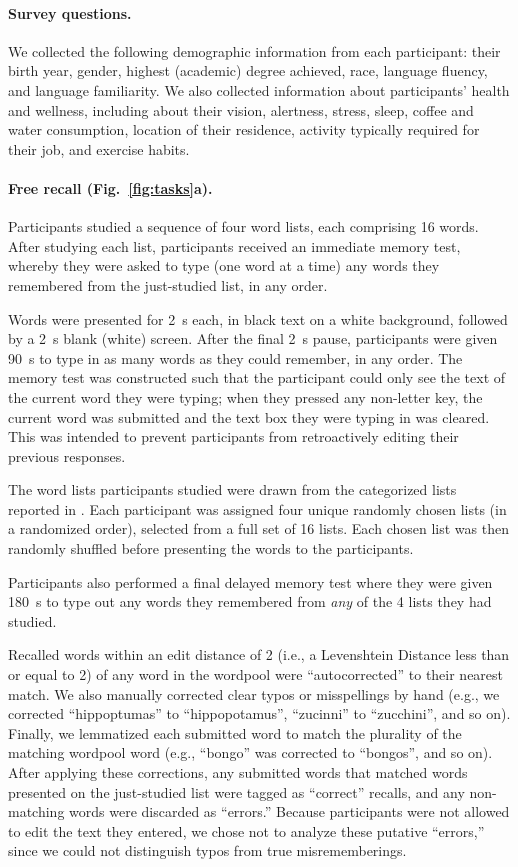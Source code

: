 \documentclass[10pt]{article}
\begin{document}
\paragraph*{Survey questions.}  We collected the following demographic
information from each participant: their birth year, gender, highest
(academic) degree achieved, race, language fluency, and language
familiarity.  We also collected information about participants'
health and wellness, including about their vision, alertness, stress, sleep, coffee
and water consumption, location of their residence, activity typically
required for their job, and exercise habits.


\paragraph*{Free recall (Fig.~\ref{fig:tasks}a).} 
Participants studied a sequence of four word lists, each comprising 16
words.  After studying each list, participants received an immediate
memory test, whereby they were asked to type (one word at a time) any
words they remembered from the just-studied list, in any order.

Words were presented for 2~s each, in black text on a white
background, followed by a 2~s blank (white) screen.  After the final
2~s pause, participants were given 90~s to type in as many words as
they could remember, in any order.  The memory test was constructed
such that the participant could only see the text of the current word
they were typing; when they pressed any non-letter key, the current
word was submitted and the text box they were typing in was cleared.
This was intended to prevent participants from retroactively editing
their previous responses.

The word lists participants studied were drawn from the categorized
lists reported in \cite{ZimaEtal18}.  Each participant was assigned
four unique randomly chosen lists (in a randomized order), selected
from a full set of 16 lists.  Each chosen list was then randomly
shuffled before presenting the words to the participants.

Participants also performed a final delayed memory test where they
were given 180~s to type out any words they remembered from
\textit{any} of the 4 lists they had studied.

Recalled words within an edit distance of 2 (i.e., a Levenshtein Distance less
than or equal to 2) of any word in the wordpool were ``autocorrected''
to their nearest match.  We also manually corrected clear typos or
misspellings by hand (e.g., we corrected ``hippoptumas'' to
``hippopotamus'', ``zucinni'' to ``zucchini'', and so on).  Finally,
we lemmatized each submitted word to match the plurality of the
matching wordpool word (e.g., ``bongo'' was corrected to ``bongos'',
and so on).  After applying these corrections, any submitted words
that matched words presented on the just-studied list were tagged as
``correct'' recalls, and any non-matching words were discarded as
``errors.''  Because participants were not allowed to edit the text
they entered, we chose not to analyze these putative ``errors,'' since
we could not distinguish typos from true misrememberings.
\end{document}

